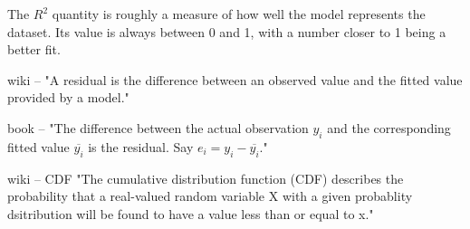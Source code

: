 The $R^2$ quantity is roughly a measure of how well the model represents the dataset. Its value is always between 0 and 1, with a number closer to 1 being a better fit. 

wiki -- "A residual is the difference between an observed value and the fitted value provided by a model."

book -- "The difference between the actual observation $y_i$ and the corresponding fitted value $\overline{y_i}$ is the residual. Say $e_i = y_i - \overline{y_i}$."

wiki -- CDF "The cumulative distribution function (CDF) describes the probability that a real-valued random variable X with a given probablity dsitribution will be found to have a value less than or equal to x."
